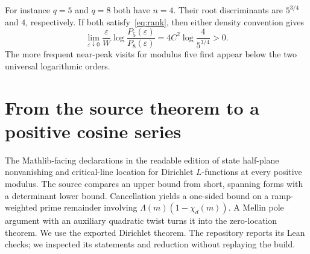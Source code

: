 \documentclass[11pt]{article}
\newcommand{\eps}{\varepsilon}\newcommand{\rd}{\operatorname{rd}}\newcommand{\EE}{\mathbb E}\newcommand{\PP}{\mathbb P}
\begin{document}
For instance $q=5$ and $q=8$ both have $n=4$. Their root discriminants are $5^{3/4}$ and $4$, respectively. If both satisfy~\eqref{eq:rank}, then either density convention gives
\[
 \lim_{\eps\downarrow0}\frac{\eps}{W}\log\frac{P_5(\eps)}{P_8(\eps)}
 =4C^2\log\frac{4}{5^{3/4}}>0.
\]
The more frequent near-peak visits for modulus five first appear below the two universal logarithmic orders.

\section{From the source theorem to a positive cosine series}\label{sec:source}
The Mathlib-facing declarations in the readable edition of \cite{lean} state half-plane nonvanishing and critical-line location for Dirichlet $L$-functions at every positive modulus. The source compares an upper bound from short, spanning forms with a determinant lower bound. Cancellation yields a one-sided bound on a ramp-weighted prime remainder involving $\Lambda(m)(1-\chi_d(m))$. A Mellin pole argument with an auxiliary quadratic twist turns it into the zero-location theorem. We use the exported Dirichlet theorem. The repository reports its Lean checks; we inspected its statements and reduction without replaying the build.
\end{document}
